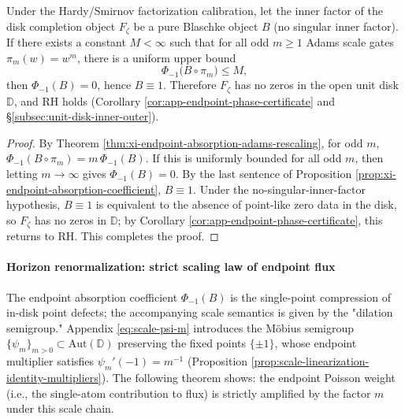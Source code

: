 \begin{theorem}[Multi-scale consistency \texorpdfstring{$\Longrightarrow$}{=>} fixed-slice support: sufficient condition for uniform upper bound of odd Adams gate endpoint budget]\label{thm:xi-multiscale-consistency-implies-rh}
Under the Hardy/Smirnov factorization calibration, let the inner factor of the disk completion object \(F_\zeta\) be a pure Blaschke object \(B\) (no singular inner factor).
If there exists a constant \(M<\infty\) such that for all odd \(m\ge 1\) Adams scale gates \(\pi_m(w)=w^m\), there is a uniform upper bound
\[
\Phi_{-1}\bigl(B\circ \pi_m\bigr)\le M,
\]
then \(\Phi_{-1}(B)=0\), hence \(B\equiv 1\).
Therefore \(F_\zeta\) has no zeros in the open unit disk \(\mathbb{D}\), and RH holds (Corollary \ref{cor:app-endpoint-phase-certificate} and \S\ref{subsec:unit-disk-inner-outer}).
\end{theorem}

\begin{proof}
By Theorem \ref{thm:xi-endpoint-absorption-adams-rescaling}, for odd \(m\),
\(
\Phi_{-1}(B\circ\pi_m)=m\,\Phi_{-1}(B)
\).
If this is uniformly bounded for all odd \(m\), then letting \(m\to\infty\) gives \(\Phi_{-1}(B)=0\).
By the last sentence of Proposition \ref{prop:xi-endpoint-absorption-coefficient}, \(B\equiv 1\).
Under the no-singular-inner-factor hypothesis, \(B\equiv 1\) is equivalent to the absence of point-like zero data in the disk, so \(F_\zeta\) has no zeros in \(\mathbb{D}\); by Corollary \ref{cor:app-endpoint-phase-certificate}, this returns to RH. This completes the proof.
\end{proof}

\paragraph{Horizon renormalization: strict scaling law of endpoint flux}
The endpoint absorption coefficient \(\Phi_{-1}(B)\) is the single-point compression of in-disk point defects; the accompanying scale semantics is given by the "dilation semigroup."
Appendix \eqref{eq:scale-psi-m} introduces the Möbius semigroup \(\{\psi_m\}_{m>0}\subset\mathrm{Aut}(\mathbb{D})\) preserving the fixed points \(\{\pm 1\}\), whose endpoint multiplier satisfies \(\psi_m'(-1)=m^{-1}\) (Proposition \ref{prop:scale-linearization-identity-multipliers}).
The following theorem shows: the endpoint Poisson weight (i.e., the single-atom contribution to flux) is strictly amplified by the factor \(m\) under this scale chain.

